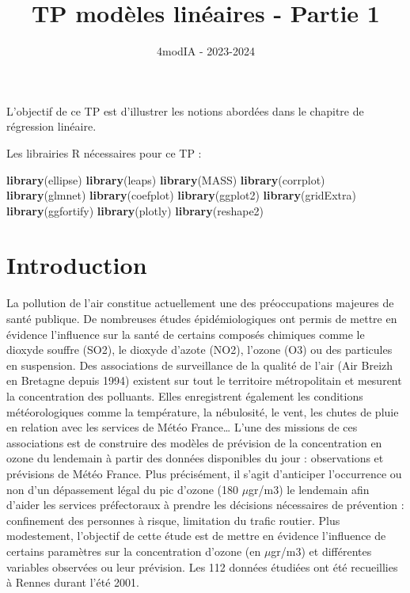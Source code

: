 \documentclass[
]{article}
\title{TP modèles linéaires - Partie 1}
\author{}
\date{\vspace{-2.5em}4modIA - 2023-2024}
\newenvironment{Shaded}{\begin{snugshade}}{\end{snugshade}}
\newcommand{\FunctionTok}[1]{\textcolor[rgb]{0.13,0.29,0.53}{\textbf{#1}}}
\newcommand{\NormalTok}[1]{#1}
\begin{document}
\maketitle

{
\setcounter{tocdepth}{4}
\tableofcontents
}
L'objectif de ce TP est d'illustrer les notions abordées dans le
chapitre de régression linéaire.

Les librairies R nécessaires pour ce TP :

\begin{Shaded}
\begin{Highlighting}[]
\FunctionTok{library}\NormalTok{(ellipse)}
\FunctionTok{library}\NormalTok{(leaps)}
\FunctionTok{library}\NormalTok{(MASS)}
\FunctionTok{library}\NormalTok{(corrplot)}
\FunctionTok{library}\NormalTok{(glmnet)}
\FunctionTok{library}\NormalTok{(coefplot)}
\FunctionTok{library}\NormalTok{(ggplot2)  }
\FunctionTok{library}\NormalTok{(gridExtra)}
\FunctionTok{library}\NormalTok{(ggfortify)}
\FunctionTok{library}\NormalTok{(plotly)   }
\FunctionTok{library}\NormalTok{(reshape2)}
\end{Highlighting}
\end{Shaded}

\hypertarget{introduction}{%
\section{Introduction}\label{introduction}}

La pollution de l'air constitue actuellement une des préoccupations
majeures de santé publique. De nombreuses études épidémiologiques ont
permis de mettre en évidence l'influence sur la santé de certains
composés chimiques comme le dioxyde souffre (SO2), le dioxyde d'azote
(NO2), l'ozone (O3) ou des particules en suspension. Des associations de
surveillance de la qualité de l'air (Air Breizh en Bretagne depuis 1994)
existent sur tout le territoire métropolitain et mesurent la
concentration des polluants. Elles enregistrent également les conditions
météorologiques comme la température, la nébulosité, le vent, les chutes
de pluie en relation avec les services de Météo France\ldots{} L'une des
missions de ces associations est de construire des modèles de prévision
de la concentration en ozone du lendemain à partir des données
disponibles du jour : observations et prévisions de Météo France. Plus
précisément, il s'agit d'anticiper l'occurrence ou non d'un dépassement
légal du pic d'ozone (180 \(\mu\)gr/m3) le lendemain afin d'aider les
services préfectoraux à prendre les décisions nécessaires de prévention
: confinement des personnes à risque, limitation du trafic routier. Plus
modestement, l'objectif de cette étude est de mettre en évidence
l'influence de certains paramètres sur la concentration d'ozone (en
\(\mu\)gr/m3) et différentes variables observées ou leur prévision. Les
112 données étudiées ont été recueillies à Rennes durant l'été 2001.
\end{document}
